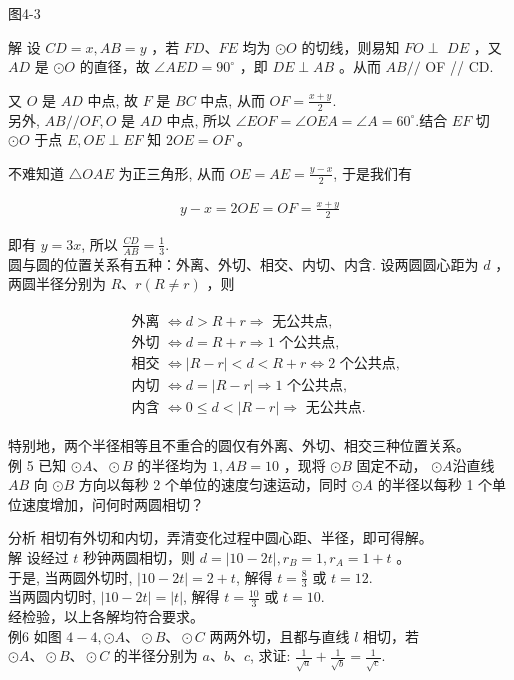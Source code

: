 \documentclass[10pt]{article}
\begin{document}
图4-3

解 设 $C D=x, A B=y$ ，若 $F D 、 F E$ 均为 $\odot O$ 的切线，则易知 $F O \perp$ $D E$ ，又 $A D$ 是 $\odot O$ 的直径，故 $\angle A E D=90^{\circ}$ ，即 $D E \perp A B$ 。从而 $A B / /$ OF // CD.

又 $O$ 是 $A D$ 中点, 故 $F$ 是 $B C$ 中点, 从而 $O F=\frac{x+y}{2}$.\\
另外, $A B / / O F, O$ 是 $A D$ 中点, 所以 $\angle E O F=\angle O E A=\angle A=60^{\circ}$.结合 $E F$ 切 $\odot O$ 于点 $E, O E \perp E F$ 知 $2 O E=O F$ 。

不难知道 $\triangle O A E$ 为正三角形, 从而 $O E=A E=\frac{y-x}{2}$, 于是我们有

\begin{align*}
y-x=2 O E=O F=\frac{x+y}{2}
\end{align*}

即有 $y=3 x$, 所以 $\frac{C D}{A B}=\frac{1}{3}$.\\
圆与圆的位置关系有五种：外离、外切、相交、内切、内含. 设两圆圆心距为 $d$ ，两圆半径分别为 $R 、 r(R \neq r)$ ，则

\begin{align*}
\begin{aligned}
& \text { 外离 } \Leftrightarrow d>R+r \Rightarrow \text { 无公共点, } \\
& \text { 外切 } \Leftrightarrow d=R+r \Rightarrow 1 \text { 个公共点, } \\
& \text { 相交 } \Leftrightarrow|R-r|<d<R+r \Leftrightarrow 2 \text { 个公共点, } \\
& \text { 内切 } \Leftrightarrow d=|R-r| \Rightarrow 1 \text { 个公共点, } \\
& \text { 内含 } \Leftrightarrow 0 \leqslant d<|R-r| \Rightarrow \text { 无公共点. }
\end{aligned}
\end{align*}

特别地，两个半径相等且不重合的圆仅有外离、外切、相交三种位置关系。\\
例 5 已知 $\odot A 、 \odot B$ 的半径均为 $1, A B=10$ ，现将 $\odot B$ 固定不动， $\odot A$沿直线 $A B$ 向 $\odot B$ 方向以每秒 2 个单位的速度匀速运动，同时 $\odot A$ 的半径以每秒 1 个单位速度增加，问何时两圆相切？

分析 相切有外切和内切，弄清变化过程中圆心距、半径，即可得解。\\
解 设经过 $t$ 秒钟两圆相切，则 $d=|10-2 t|, r_{B}=1, r_{A}=1+t$ 。\\
于是, 当两圆外切时, $|10-2 t|=2+t$, 解得 $t=\frac{8}{3}$ 或 $t=12$.\\
当两圆内切时, $|10-2 t|=|t|$, 解得 $t=\frac{10}{3}$ 或 $t=10$.\\
经检验，以上各解均符合要求。\\
例6 如图 $4-4, \odot A 、 \odot B 、 \odot C$ 两两外切，且都与直线 $l$ 相切，若 $\odot A 、 \odot B 、 \odot C$ 的半径分别为 $a 、 b 、 c$, 求证: $\frac{1}{\sqrt{a}}+\frac{1}{\sqrt{b}}=\frac{1}{\sqrt{c}}$.
\end{document}

